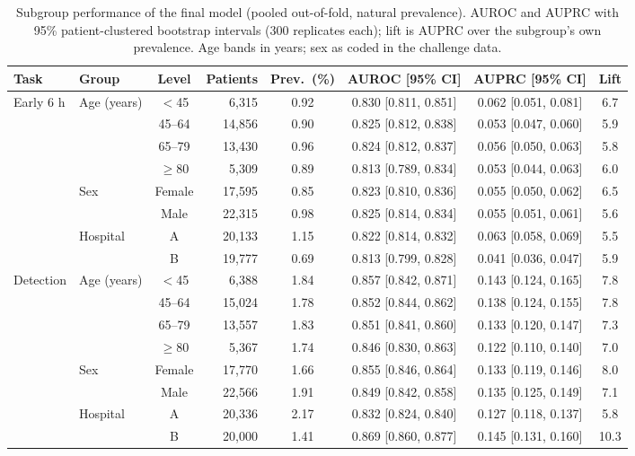 \begin{table}[!t]
\centering\scriptsize\setlength{\tabcolsep}{3pt}
\caption{Subgroup performance of the final model (pooled out-of-fold, natural prevalence). AUROC and AUPRC with 95\% patient-clustered bootstrap intervals (300 replicates each); lift is AUPRC over the subgroup's own prevalence. Age bands in years; sex as coded in the challenge data.}
\label{tab:subgroups}
\begin{adjustbox}{max width=\linewidth}
\begin{tabular}{llcrcccc}
\toprule
Task & Group & Level & Patients & Prev.\ (\%) & AUROC [95\% CI] & AUPRC [95\% CI] & Lift \\
\midrule
Early 6 h & Age (years) & $<$45 & 6{,}315 & 0.92 & 0.830 [0.811, 0.851] & 0.062 [0.051, 0.081] & 6.7 \\
 &  & 45--64 & 14{,}856 & 0.90 & 0.825 [0.812, 0.838] & 0.053 [0.047, 0.060] & 5.9 \\
 &  & 65--79 & 13{,}430 & 0.96 & 0.824 [0.812, 0.837] & 0.056 [0.050, 0.063] & 5.8 \\
 &  & $\geq$80 & 5{,}309 & 0.89 & 0.813 [0.789, 0.834] & 0.053 [0.044, 0.063] & 6.0 \\
 & Sex & Female & 17{,}595 & 0.85 & 0.823 [0.810, 0.836] & 0.055 [0.050, 0.062] & 6.5 \\
 &  & Male & 22{,}315 & 0.98 & 0.825 [0.814, 0.834] & 0.055 [0.051, 0.061] & 5.6 \\
 & Hospital & A & 20{,}133 & 1.15 & 0.822 [0.814, 0.832] & 0.063 [0.058, 0.069] & 5.5 \\
 &  & B & 19{,}777 & 0.69 & 0.813 [0.799, 0.828] & 0.041 [0.036, 0.047] & 5.9 \\
\midrule
Detection & Age (years) & $<$45 & 6{,}388 & 1.84 & 0.857 [0.842, 0.871] & 0.143 [0.124, 0.165] & 7.8 \\
 &  & 45--64 & 15{,}024 & 1.78 & 0.852 [0.844, 0.862] & 0.138 [0.124, 0.155] & 7.8 \\
 &  & 65--79 & 13{,}557 & 1.83 & 0.851 [0.841, 0.860] & 0.133 [0.120, 0.147] & 7.3 \\
 &  & $\geq$80 & 5{,}367 & 1.74 & 0.846 [0.830, 0.863] & 0.122 [0.110, 0.140] & 7.0 \\
 & Sex & Female & 17{,}770 & 1.66 & 0.855 [0.846, 0.864] & 0.133 [0.119, 0.146] & 8.0 \\
 &  & Male & 22{,}566 & 1.91 & 0.849 [0.842, 0.858] & 0.135 [0.125, 0.149] & 7.1 \\
 & Hospital & A & 20{,}336 & 2.17 & 0.832 [0.824, 0.840] & 0.127 [0.118, 0.137] & 5.8 \\
 &  & B & 20{,}000 & 1.41 & 0.869 [0.860, 0.877] & 0.145 [0.131, 0.160] & 10.3 \\
\bottomrule
\end{tabular}
\end{adjustbox}
\end{table}
